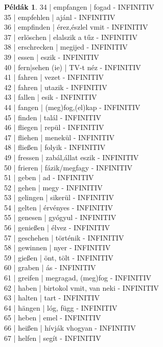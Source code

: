 \documentclass{article}
\theoremstyle{definition}
\newtheorem*{exmp}{Példák}
\begin{document}
\begin{exmp}
34 | empfangen | fogad - INFINITIV\\
35 | empfehlen | ajánl - INFINITIV\\
36 | empfinden | érez,észlel vmit - INFINITIV\\
37 | erlöschen | elalszik a tűz - INFINITIV\\
38 | erschrecken | megijed - INFINITIV\\
39 | essen | eszik - INFINITIV\\
40 | fern|sehen (ie) | TV-t néz - INFINITIV\\
41 | fahren | vezet - INFINITIV\\
42 | fahren | utazik - INFINITIV\\
43 | fallen | esik - INFINITIV\\
44 | fangen | (meg)fog,(el)kap - INFINITIV\\
45 | finden | talál - INFINITIV\\
46 | fliegen | repül - INFINITIV\\
47 | fliehen | menekül - INFINITIV\\
48 | fließen | folyik - INFINITIV\\
49 | fressen | zabál,állat eszik - INFINITIV\\
50 | frieren | fázik/megfagy - INFINITIV\\
51 | geben | ad - INFINITIV\\
52 | gehen | megy - INFINITIV\\
53 | gelingen | sikerül - INFINITIV\\
54 | gelten | érvényes - INFINITIV\\
55 | genesen | gyógyul - INFINITIV\\
56 | genießen | élvez - INFINITIV\\
57 | geschehen | történik - INFINITIV\\
58 | gewinnen | nyer - INFINITIV\\
59 | gießen | önt, tölt - INFINITIV\\
60 | graben | ás - INFINITIV\\
61 | greifen | megragad, (meg)fog - INFINITIV\\
62 | haben | birtokol vmit, van neki - INFINITIV\\
63 | halten | tart - INFINITIV\\
64 | hängen | lóg, függ - INFINITIV\\
65 | heben | emel - INFINITIV\\
66 | heißen | hívják vhogyan - INFINITIV\\
67 | helfen | segít - INFINITIV\\

\end{exmp}
\end{document}
